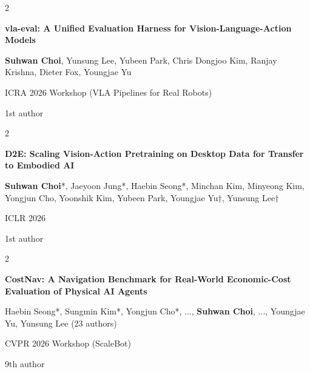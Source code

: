 \documentclass[10pt, letterpaper]{article}
\newenvironment{pubentry}[2][]{
    \onecolentry
    \def\secondColumn{#2}
    \setcolumnwidth{\fill, 2 cm}
    \begin{paracol}{2}
}{
    \switchcolumn \raggedleft \secondColumn
    \end{paracol}
    \endonecolentry
} %
\let\hrefWithoutArrow\href
\renewcommand{\href}[2]{\hrefWithoutArrow{#1}{\ifthenelse{\equal{#2}{}}{ }{#2 }\raisebox{.15ex}{\footnotesize \faExternalLink*}}}
\begin{document}

\begin{samepage}
    \begin{pubentry}{
            1st author
        }
        \textbf{vla-eval: A Unified Evaluation Harness for Vision-Language-Action Models} \href{https://github.com/allenai/vla-evaluation-harness}{[Code]} \href{https://icra2026vlapipeline.github.io/}{[Workshop]}

        \vspace{0.10 cm}

        \small \textbf{Suhwan Choi}, Yunsung Lee, Yubeen Park, Chris Dongjoo Kim, Ranjay Krishna, Dieter Fox, Youngjae Yu

        \vspace{0.10 cm}

        ICRA 2026 Workshop (VLA Pipelines for Real Robots)
    \end{pubentry}
\end{samepage}

\vspace{0.2 cm}

\begin{samepage}
    \begin{pubentry}{
            1st author
        }
        \textbf{D2E: Scaling Vision-Action Pretraining on Desktop Data for Transfer to Embodied AI} \href{https://worv-ai.github.io/d2e/}{[Website]}

        \vspace{0.10 cm}

        \small \textbf{Suhwan Choi}*, Jaeyoon Jung*, Haebin Seong*, Minchan Kim, Minyeong Kim, Yongjun Cho, Yoonshik Kim, Yubeen Park, Youngjae Yu†, Yunsung Lee†

        \vspace{0.10 cm}

        ICLR 2026
    \end{pubentry}
\end{samepage}

\vspace{0.2 cm}

\begin{samepage}
    \begin{pubentry}{
            9th author
        }
        \textbf{CostNav: A Navigation Benchmark for Real-World Economic-Cost Evaluation of Physical AI Agents} \href{https://worv-ai.github.io/costnav/}{[Website]} \href{https://scalebot-workshop.github.io/}{[Workshop]}

        \vspace{0.10 cm}

        \small Haebin Seong*, Sungmin Kim*, Yongjun Cho*, ..., \textbf{Suhwan Choi}, ..., Youngjae Yu, Yunsung Lee (23 authors)

        \vspace{0.10 cm}

        CVPR 2026 Workshop (ScaleBot)
    \end{pubentry}
\end{samepage}
\end{document}
